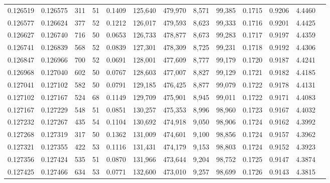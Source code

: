 \begin{tabular}{rrrrrrrrrrrrr}
0.126519 & 0.126575 &   311 &  51 &                                     0.1409 & 125,640 & 479,970 &   8,571 &  99,385 & 0.1715 & 0.9206 & 4.4460 \\
0.126577 & 0.126624 &   377 &  52 &                                     0.1212 & 126,017 & 479,593 &   8,623 &  99,333 & 0.1716 & 0.9201 & 4.4425 \\
0.126627 & 0.126740 &   716 &  50 &                                     0.0653 & 126,733 & 478,877 &   8,673 &  99,283 & 0.1717 & 0.9197 & 4.4359 \\
0.126741 & 0.126839 &   568 &  52 &                                     0.0839 & 127,301 & 478,309 &   8,725 &  99,231 & 0.1718 & 0.9192 & 4.4306 \\
0.126847 & 0.126966 &   700 &  52 &                                     0.0691 & 128,001 & 477,609 &   8,777 &  99,179 & 0.1720 & 0.9187 & 4.4241 \\
0.126968 & 0.127040 &   602 &  50 &                                     0.0767 & 128,603 & 477,007 &   8,827 &  99,129 & 0.1721 & 0.9182 & 4.4185 \\
0.127041 & 0.127102 &   582 &  50 &                                     0.0791 & 129,185 & 476,425 &   8,877 &  99,079 & 0.1722 & 0.9178 & 4.4131 \\
0.127102 & 0.127167 &   524 &  68 &                                     0.1149 & 129,709 & 475,901 &   8,945 &  99,011 & 0.1722 & 0.9171 & 4.4083 \\
0.127167 & 0.127229 &   548 &  51 &                                     0.0851 & 130,257 & 475,353 &   8,996 &  98,960 & 0.1723 & 0.9167 & 4.4032 \\
0.127232 & 0.127267 &   435 &  54 &                                     0.1104 & 130,692 & 474,918 &   9,050 &  98,906 & 0.1724 & 0.9162 & 4.3992 \\
0.127268 & 0.127319 &   317 &  50 &                                     0.1362 & 131,009 & 474,601 &   9,100 &  98,856 & 0.1724 & 0.9157 & 4.3962 \\
0.127321 & 0.127355 &   422 &  53 &                                     0.1116 & 131,431 & 474,179 &   9,153 &  98,803 & 0.1724 & 0.9152 & 4.3923 \\
0.127356 & 0.127424 &   535 &  51 &                                     0.0870 & 131,966 & 473,644 &   9,204 &  98,752 & 0.1725 & 0.9147 & 4.3874 \\
0.127425 & 0.127466 &   634 &  53 &                                     0.0771 & 132,600 & 473,010 &   9,257 &  98,699 & 0.1726 & 0.9143 & 4.3815 \\

\end{tabular}
